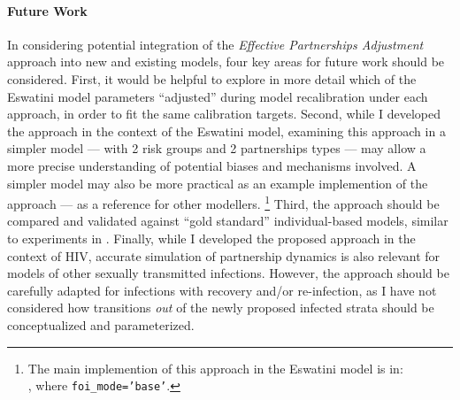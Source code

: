 \paragraph{Future Work}
In considering potential integration of the \emph{Effective Partnerships Adjustment} approach
into new and existing models, four key areas for future work should be considered.
First, it would be helpful to explore in more detail which of the Eswatini model parameters
``adjusted'' during model recalibration under each approach,
in order to fit the same calibration targets.
Second, while I developed the approach in the context of the Eswatini model,
examining this approach in a simpler model
--- \eg with 2 risk groups and 2 partnerships types ---
may allow a more precise understanding of potential biases and mechanisms involved.
A simpler model may also be more practical as an example implemention of the approach
--- \eg as a reference for other modellers.%
\footnote{The main implemention of this approach in the Eswatini model is in:\\
 ,
  where \texttt{foi_mode='base'}.}
Third, the approach should be compared and validated against
``gold standard'' individual-based models, similar to experiments in \cite{Johnson2016mf}.
Finally, while I developed the proposed approach in the context of HIV,
accurate simulation of partnership dynamics is also relevant for
models of other sexually transmitted infections.
However, the approach should be carefully adapted for
infections with recovery and/or re-infection,
as I have not considered how transitions \emph{out} of the newly proposed infected strata
should be conceptualized and parameterized.
